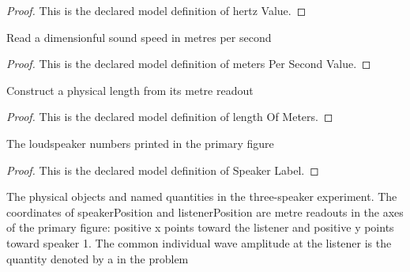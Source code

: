 \begin{proof}
  This is the declared model definition of hertz Value.
\end{proof}
\begin{definition}
  \label{def:physics:phyx-mini-0186:phyxminiproblems-problemphyxmini0186-meterspersecondvalue}
  Read a dimensionful sound speed in metres per second
\end{definition}
\begin{proof}
  This is the declared model definition of meters Per Second Value.
\end{proof}
\begin{definition}
  \label{def:physics:phyx-mini-0186:phyxminiproblems-problemphyxmini0186-lengthofmeters}
  Construct a physical length from its metre readout
\end{definition}
\begin{proof}
  This is the declared model definition of length Of Meters.
\end{proof}
\begin{definition}
  \label{def:physics:phyx-mini-0186:phyxminiproblems-problemphyxmini0186-speakerlabel}
  The loudspeaker numbers printed in the primary figure
\end{definition}
\begin{proof}
  This is the declared model definition of Speaker Label.
\end{proof}
\begin{definition}
  \label{def:physics:phyx-mini-0186:phyxminiproblems-problemphyxmini0186-threespeakerinterferencesetup}
  The physical objects and named quantities in the three-speaker experiment. The coordinates of speakerPosition and listenerPosition are metre readouts in the axes of the primary figure: positive x points toward the listener and positive y points toward speaker 1. The common individual wave amplitude at the listener is the quantity denoted by a in the problem
\end{definition}

